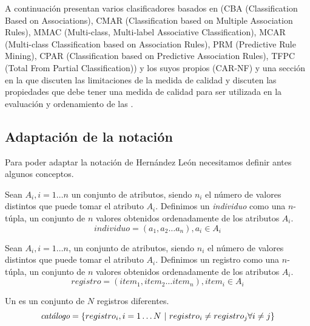 A continuación presentan varios clasificadores basados en \sCARs (CBA (Classification Based on Associations), CMAR (Classification based on Multiple Association Rules), MMAC (Multi-class, Multi-label Associative Classification), MCAR (Multi-class Classification
based on Association Rules), PRM (Predictive Rule Mining), CPAR (Classification based on Predictive Association Rules), TFPC (Total From Partial Classification)) y los suyos propios (CAR-NF) y una sección en la que discuten las limitaciones de la medida de calidad \Confianza y discuten las propiedades que debe tener una medida de calidad para ser utilizada en la evaluación y ordenamiento de las \sCARs.










\subsection{Adaptación de la notación}
\label{sec:clasificacion:conceptos-basicos:tal}
%
Para poder adaptar la notación de Hernández León necesitamos definir antes algunos conceptos.

\begin{Definition}[Individuo]
   Sean $A_i, i = 1 \ldots n$ un conjunto de atributos, siendo $n_i$ el número de valores distintos que puede tomar el atributo $A_i$. Definimos un \emph{individuo} como una $n$-túpla, un conjunto de $n$ valores obtenidos ordenadamente de los atributos $A_i$.
   $$individuo = \left(a_1, a_2\ldots a_n\right), a_i \in A_i$$
\label{def:individuo}
\end{Definition}


\begin{Definition}[Registro]
   Sean $A_i, i = 1 \ldots n$, un conjunto de atributos, siendo $n_i$ el número de valores distintos que puede tomar el atributo $A_i$. Definimos un registro como una $n$-túpla, un conjunto de $n$ valores obtenidos ordenadamente de los atributos $A_i$.
   $$registro = \left(item_1, item_2\ldots item_n\right), item_i \in A_i$$
\label{def:registro}
\end{Definition}

\begin{Definition}[\Catalogo] Un \catalogo es un conjunto de $N$ registros diferentes.
   $$\catalogo = \left\{registro_i, i = 1\ldots N\ | \ registro_i \neq registro_j \forall i \neq j\right\}$$
\label{def:catalogo}
\end{Definition}
